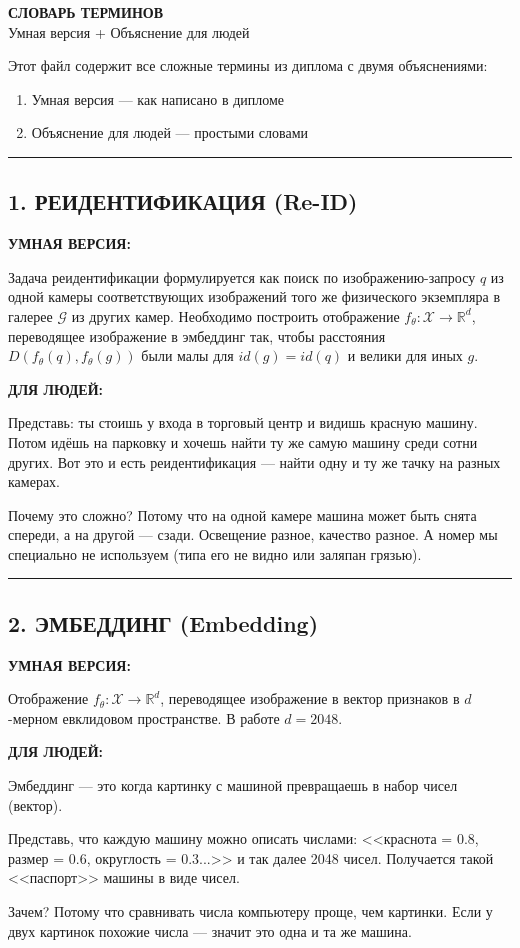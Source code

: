 \documentclass[12pt,a4paper]{article}
\newcommand{\term}[3]{
\noindent\rule{\textwidth}{1pt}
\subsection*{#1}

\textcolor{smartgreen}{\textbf{УМНАЯ ВЕРСИЯ:}}

#2

\vspace{0.5em}
\textcolor{simpleblue}{\textbf{ДЛЯ ЛЮДЕЙ:}}

#3

\vspace{1em}
}
\begin{document}
\begin{center}
{\LARGE\textbf{СЛОВАРЬ ТЕРМИНОВ}}\\[0.5em]
{\large Умная версия + Объяснение для людей}
\end{center}

\vspace{1em}

Этот файл содержит все сложные термины из диплома с двумя объяснениями:
\begin{enumerate}
\item Умная версия — как написано в дипломе
\item Объяснение для людей — простыми словами
\end{enumerate}

\vspace{1em}

\term{1. РЕИДЕНТИФИКАЦИЯ (Re-ID)}
{Задача реидентификации формулируется как поиск по изображению-запросу $q$ из одной камеры соответствующих изображений того же физического экземпляра в галерее $\mathcal{G}$ из других камер. Необходимо построить отображение $f_\theta: \mathcal{X}\rightarrow\mathbb{R}^d$, переводящее изображение в эмбеддинг так, чтобы расстояния $D(f_\theta(q), f_\theta(g))$ были малы для $id(g)=id(q)$ и велики для иных $g$.}
{Представь: ты стоишь у входа в торговый центр и видишь красную машину. Потом идёшь на парковку и хочешь найти ту же самую машину среди сотни других. Вот это и есть реидентификация — найти одну и ту же тачку на разных камерах.

Почему это сложно? Потому что на одной камере машина может быть снята спереди, а на другой — сзади. Освещение разное, качество разное. А номер мы специально не используем (типа его не видно или заляпан грязью).}

\term{2. ЭМБЕДДИНГ (Embedding)}
{Отображение $f_\theta: \mathcal{X} \rightarrow \mathbb{R}^d$, переводящее изображение в вектор признаков в $d$-мерном евклидовом пространстве. В работе $d=2048$.}
{Эмбеддинг — это когда картинку с машиной превращаешь в набор чисел (вектор).

Представь, что каждую машину можно описать числами: <<краснота = 0.8, размер = 0.6, округлость = 0.3...>> и так далее 2048 чисел. Получается такой <<паспорт>> машины в виде чисел.

Зачем? Потому что сравнивать числа компьютеру проще, чем картинки. Если у двух картинок похожие числа — значит это одна и та же машина.}
\end{document}

